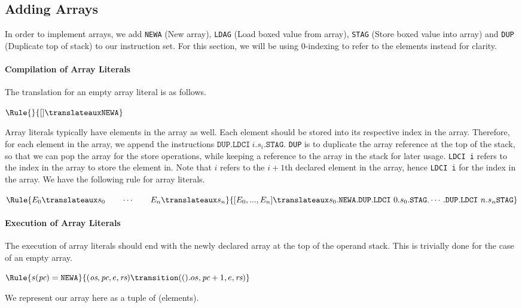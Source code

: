 \subsection{Adding Arrays}

In order to implement arrays, we add \texttt{NEWA} (New array),
\texttt{LDAG} (Load boxed value from array),
\texttt{STAG} (Store boxed value into array) and \texttt{DUP} 
(Duplicate top of stack) to our instruction set. For this section,
we will be using 0-indexing to refer to the elements instead for clarity.

\paragraph{Compilation of Array Literals}
The translation for an empty array literal is as follows.

$\Rule{}{\lbrack\rbrack \translateaux \texttt{NEWA}}$

Array literals typically have elements in the array as well. 
Each element should be stored into its respective index in the array.
Therefore, for each element in the array, we append the instructions
$\texttt{DUP}.\texttt{LDCI}\ i.s_i.\texttt{STAG}$. 
\texttt{DUP} is to duplicate the
array reference at the top of the stack, so that we can pop the array 
for the store operations, while keeping a reference to the array in 
the stack for later usage. \texttt{LDCI i} refers to the index in the array
to store the element in. Note that $i$ refers to the $i+1$th declared element
in the array, hence \texttt{LDCI i} for the index in the array.
We have the following rule for array literals.

$\Rule{E_0 \translateaux s_0 \qquad \cdots \qquad E_n \translateaux s_n}{
\lbrack E_0, ..., E_n\rbrack \translateaux s_0. \texttt{NEWA}.\texttt{DUP}
.\texttt{LDCI}\ 0.s_0.\texttt{STAG}. \cdots .\texttt{DUP}
.\texttt{LDCI}\ n.s_n\texttt{STAG}}
$

\paragraph{Execution of Array Literals}
The execution of array literals should end with the newly declared
array at the top of the operand stack. This is trivially done for the
case of an empty array.

$\Rule{s(\textit{pc}) = \texttt{NEWA}}{
(\textit{os},\textit{pc},e,\textit{rs}) \transition 
(().os,\textit{pc}+1,e,\textit{rs})}
$

We represent our array here as a tuple of (elements).

